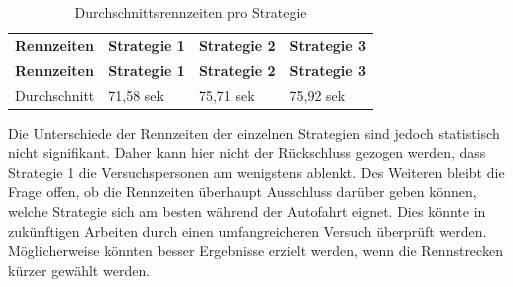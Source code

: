 \documentclass[12pt,a4paper]{scrartcl}
\begin{document}
\begin{longtable}{p{3cm}p{3cm}p{3cm}p{3cm} }
	\label{RennZeitenDis1}\\
	\caption[Durchschnittsrennzeiten pro Strategie]{Durchschnittsrennzeiten pro Strategie}\\
	\hline
	\textbf{Rennzeiten}&\textbf{Strategie 1}&\textbf{Strategie 2} &\textbf{Strategie 3}\\
	\hline
	\endfirsthead
	\hline
	\textbf{Rennzeiten}&\textbf{Strategie 1}&\textbf{Strategie 2} &\textbf{Strategie 3}\\
	\hline
	\endhead
Durchschnitt & 71,58 sek & 75,71 sek & 75,92 sek\\
\hline
\end{longtable}
Die Unterschiede der Rennzeiten der einzelnen Strategien sind jedoch statistisch nicht signifikant. Daher kann hier nicht der Rückschluss gezogen werden, dass Strategie 1 die Versuchspersonen am wenigstens ablenkt. Des Weiteren bleibt die Frage offen, ob die Rennzeiten überhaupt Ausschluss darüber geben können, welche Strategie sich am besten während der Autofahrt eignet. Dies könnte in zukünftigen Arbeiten durch einen umfangreicheren Versuch überprüft werden. Möglicherweise könnten besser Ergebnisse erzielt werden, wenn die Rennstrecken kürzer gewählt werden.  
\end{document}
